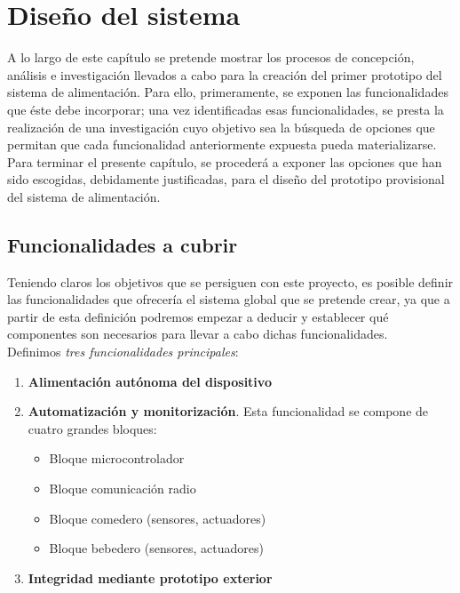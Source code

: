 \documentclass[12pt]{article}
\begin{document}
	\pagebreak
	
	\section[Diseño del sistema]{Diseño del sistema}
	
	\noindent A lo largo de este capítulo se pretende mostrar los procesos de concepción, análisis e investigación llevados a cabo para la creación del primer prototipo del sistema de alimentación. Para ello, primeramente, se exponen las funcionalidades que éste debe incorporar; una vez identificadas esas funcionalidades, se presta la realización de una investigación cuyo objetivo sea la búsqueda de opciones que permitan que cada funcionalidad anteriormente expuesta pueda materializarse. Para terminar el presente capítulo, se procederá a exponer las opciones que han sido escogidas, debidamente justificadas, para el diseño del prototipo provisional del sistema de alimentación. 
	
	\subsection[Funcionalidades a cubrir]{Funcionalidades a cubrir}
	
	\noindent Teniendo claros los objetivos que se persiguen con este proyecto, es posible definir las funcionalidades que ofrecería el sistema global que se pretende crear, ya que a partir de esta definición podremos empezar a deducir y establecer qué componentes son necesarios para llevar a cabo dichas funcionalidades. \\
	
	\noindent Definimos \textit{tres funcionalidades principales}: 
	
	\begin{enumerate}
		\item \textbf{Alimentación autónoma del dispositivo}
		\item \textbf{Automatización y monitorización}. Esta funcionalidad se compone de cuatro grandes bloques:
		\begin{itemize}
			\item Bloque microcontrolador
			\item Bloque comunicación radio 
			\item Bloque comedero (sensores, actuadores)
			\item Bloque bebedero (sensores, actuadores)
		\end{itemize}
	
		\item \textbf{Integridad mediante prototipo exterior}
	\end{enumerate}
	
\end{document}
